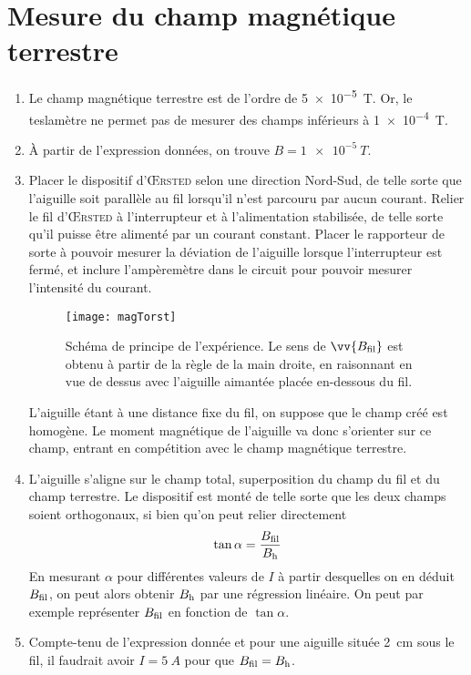\documentclass[a4paper, 11pt, final, garamond]{book}
\begin{document}
\section{Mesure du champ magnétique terrestre}
\label{sec:meschpterre}
\begin{enumerate}
  \item Le champ magnétique terrestre est de l'ordre de \SI{5e-5}{T}. Or, le
    teslamètre ne permet pas de mesurer des champs inférieurs à \SI{1e-4}{T}.
  \item À partir de l'expression données, on trouve $B = \SI{1e-5}{T}$.
  \item Placer le dispositif d'\textsc{Œrsted} selon une direction Nord-Sud, de
    telle sorte que l'aiguille soit parallèle au fil lorsqu'il n'est parcouru
    par aucun courant. Relier le fil d'\textsc{Œrsted} à l'interrupteur et à
    l'alimentation stabilisée, de telle sorte qu'il puisse être alimenté par un
    courant constant. Placer le rapporteur de sorte à pouvoir mesurer la
    déviation de l'aiguille lorsque l'interrupteur est fermé, et inclure
    l'ampèremètre dans le circuit pour pouvoir mesurer l'intensité du courant.
    \begin{figure}[h]
      \centering
      \texttt{[image: magTorst]}
      \caption{Schéma de principe de l'expérience. Le sens de
      $\protect\vv{B_{\rm fil}}$ est obtenu à partir de la règle de la main
    droite, en raisonnant en vue de dessus avec l'aiguille aimantée placée
  en-dessous du fil.}
      \label{fig:orstedcorr}
    \end{figure}
    L'aiguille étant à une distance fixe du fil, on suppose que le champ créé
    est homogène. Le moment magnétique de l'aiguille va donc s'orienter sur ce
    champ, entrant en compétition avec le champ magnétique terrestre.
  \item L'aiguille s'aligne sur le champ total, superposition du champ du fil et
    du champ terrestre. Le dispositif est monté de telle sorte que les deux
    champs soient orthogonaux, si bien qu'on peut relier directement
    \[
      \tan{\alpha} = \frac{B_{\rm fil}}{B_{\rm h}}
    \]
    En mesurant $\alpha$ pour différentes valeurs de $I$ à partir desquelles on
    en déduit $B_{\rm fil}$, on peut alors obtenir $B_{\rm h}$ par une
    régression linéaire. On peut par exemple représenter $B_{\rm fil}$ en
    fonction de $\tan{\alpha}$.
  \item Compte-tenu de l'expression donnée et pour une aiguille située
    \SI{2}{cm} sous le fil, il faudrait avoir $I = \SI{5}{A}$ pour que $B_{\rm
    fil} = B_{\rm h}$.
\end{enumerate}
\end{document}
